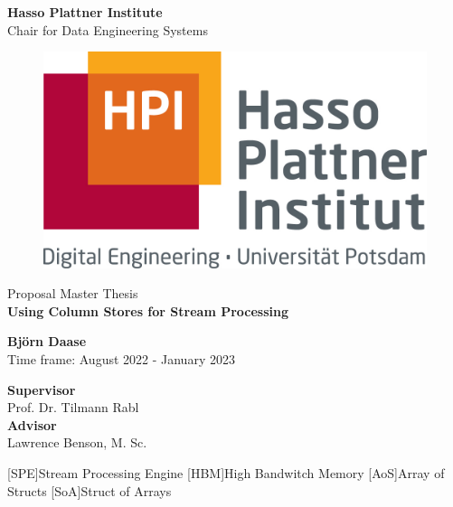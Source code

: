 \documentclass[a4paper, titlepage, 12pt]{article}
\newcommand{\thesisTitle}{Using Column Stores for Stream Processing}
\newcommand{\name}{Björn Daase}
\newcommand{\timeFrame}{August 2022 - January 2023}
\newcommand{\supervisor}{Prof. Dr. Tilmann Rabl}
\newcommand{\advisor}{Lawrence Benson, M. Sc.}
\newcommand{\thesisType}{Master}
\begin{document}
\begin{titlepage}
\begin{center}
\LARGE{\textbf{Hasso Plattner Institute}}\\
\normalsize{Chair for Data Engineering Systems}\\[0.3cm]

\begin{figure}[h!]
    \centering
    \includegraphics[width=.3\linewidth]{images/hpi_logo.jpg}
\end{figure}
\vspace{1cm}

\LARGE{Proposal {\thesisType} Thesis}\\[0.7cm]
\Huge{\textbf{\thesisTitle}}

\vspace{1cm} 

\Large{\textbf{\name}} \\[3pt]  
\vspace{0.5cm}
\large{Time frame: \timeFrame} \\ 

\vspace{1cm}

\large{\textbf{Supervisor}}\\
\supervisor\\
\vspace{0.5cm}
\textbf{Advisor}\\
\advisor\\
\end{center}
\end{titlepage}







\clearpage

\begin{acronym}
    [SPE]{Stream Processing Engine}
    [HBM]{High Bandwitch Memory}
    [AoS]{Array of Structs}
    [SoA]{Struct of Arrays}
\end{acronym}


{\small 

}
\end{document}
